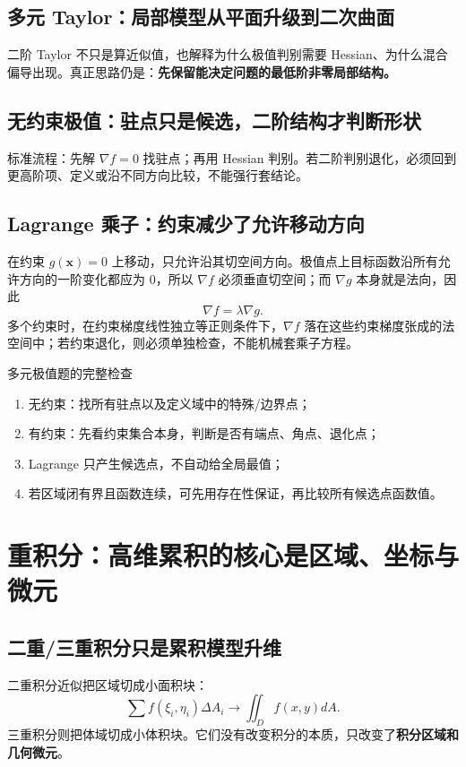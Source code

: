 \documentclass[11pt,a4paper,openany]{ctexbook}
\newcommand{\key}[1]{\textbf{\color{deep}#1}}
\begin{document}
\section{多元 Taylor：局部模型从平面升级到二次曲面}
二阶 Taylor 不只是算近似值，也解释为什么极值判别需要 Hessian、为什么混合偏导出现。真正思路仍是：\key{先保留能决定问题的最低阶非零局部结构。}

\section{无约束极值：驻点只是候选，二阶结构才判断形状}
标准流程：先解 $\nabla f=0$ 找驻点；再用 Hessian 判别。若二阶判别退化，必须回到更高阶项、定义或沿不同方向比较，不能强行套结论。

\section{Lagrange 乘子：约束减少了允许移动方向}
在约束 $g(\bm x)=0$ 上移动，只允许沿其切空间方向。极值点上目标函数沿所有允许方向的一阶变化都应为 0，所以 $\nabla f$ 必须垂直切空间；而 $\nabla g$ 本身就是法向，因此
\[
\boxed{\nabla f=\lambda\nabla g}.
\]
多个约束时，在约束梯度线性独立等正则条件下，$\nabla f$ 落在这些约束梯度张成的法空间中；若约束退化，则必须单独检查，不能机械套乘子方程。

\begin{methodbox}{多元极值题的完整检查}
\begin{enumerate}
  \item 无约束：找所有驻点以及定义域中的特殊/边界点；
  \item 有约束：先看约束集合本身，判断是否有端点、角点、退化点；
  \item Lagrange 只产生候选点，不自动给全局最值；
  \item 若区域闭有界且函数连续，可先用存在性保证，再比较所有候选点函数值。
\end{enumerate}
\end{methodbox}

\chapter{重积分：高维累积的核心是区域、坐标与微元}

\section{二重/三重积分只是累积模型升维}
二重积分近似把区域切成小面积块：
\[
\sum f(\xi_i,\eta_i)\Delta A_i\to\iint_D f(x,y)dA.
\]
三重积分则把体域切成小体积块。它们没有改变积分的本质，只改变了\key{积分区域和几何微元}。
\end{document}

